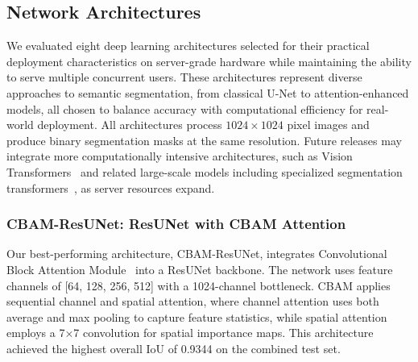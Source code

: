 \documentclass[preprint,12pt]{elsarticle}
\begin{document}
\subsection{Network Architectures}
\label{subsec:architectures}

We evaluated eight deep learning architectures selected for their practical deployment characteristics on server-grade hardware while maintaining the ability to serve multiple concurrent users. These architectures represent diverse approaches to semantic segmentation, from classical U-Net to attention-enhanced models, all chosen to balance accuracy with computational efficiency for real-world deployment. All architectures process $1024 \times 1024$ pixel images and produce binary segmentation masks at the same resolution. Future releases may integrate more computationally intensive architectures, such as Vision Transformers~\cite{Dosovitskiy2020} and related large-scale models including specialized segmentation transformers~\cite{Zheng2021,Xie2021}, as server resources expand.

\subsubsection{CBAM-ResUNet: ResUNet with CBAM Attention}
Our best-performing architecture, CBAM-ResUNet, integrates Convolutional Block Attention Module~\cite{woo2018cbam} into a ResUNet backbone. The network uses feature channels of [64, 128, 256, 512] with a 1024-channel bottleneck. CBAM applies sequential channel and spatial attention, where channel attention uses both average and max pooling to capture feature statistics, while spatial attention employs a 7×7 convolution for spatial importance maps. This architecture achieved the highest overall IoU of 0.9344 on the combined test set.
\end{document}
